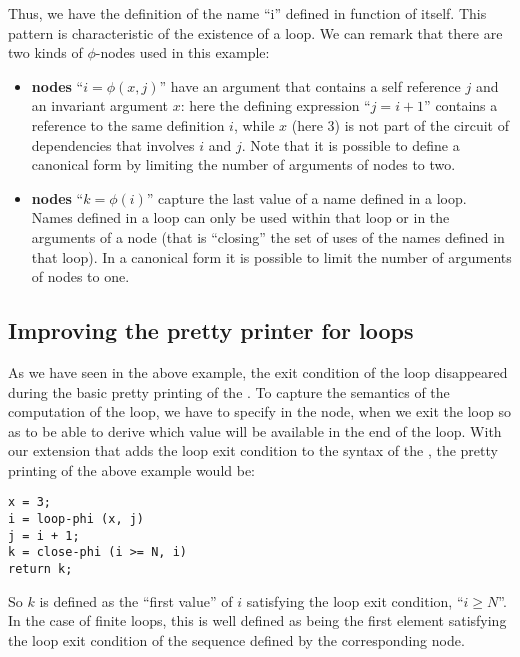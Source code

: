 {\noindent
Thus, we have the definition of the \SSA{} name ``i'' defined in
function of itself.  This pattern is characteristic of the existence
of a loop.  We can remark that there are two kinds of $\phi$-nodes used in this example:
\begin{itemize}
\item {\bf \loopphi{} nodes}  ``$i = \phi (x, j)$'' have an argument that contains a self reference $j$ and an invariant argument
  $x$: here the defining expression ``$j = i + 1$'' contains a reference to
  the same \loopphi{} definition $i$, while $x$ (here $3$) is not part of the circuit of dependencies that involves $i$ and $j$. Note that it is possible to define a
  canonical \SSA{} form by limiting the number of arguments of
  \loopphi{} nodes to two.
\item {\bf \closephi{} nodes} ``$k = \phi (i)$''  capture the last value of a name defined
  in a loop.  Names defined in a loop can only be used within that
  loop or in the arguments of a \closephi{} node (that is ``closing''
  the set of uses of the names defined in that loop).  In a canonical
  \SSA{} form it is possible to limit the number of arguments of
  \closephi{} nodes to one.
\end{itemize}

\subsection{Improving the \SSA{} pretty printer for loops}

As we have seen in the above example, the exit condition of the loop
disappeared during the basic pretty printing of the \SSA{}.  To capture
the semantics of the computation of the loop, we have to specify in
the \closephi{} node, when we exit the loop so as to be able to derive which value will be available in the end of the
loop. With our
extension that adds the loop exit condition to the syntax of the \closephi{}, the \SSA{} pretty printing of the above example would be:

\begin{center}
  \begin{minipage}{.8\linewidth}
\begin{verbatim}
x = 3;
i = loop-phi (x, j)
j = i + 1;
k = close-phi (i >= N, i)
return k;
\end{verbatim}
\end{minipage}
\end{center}
So $k$ is defined as the ``first value'' of $i$ satisfying the loop
exit condition, ``$i \geq N$''.  In the case of finite loops, this is well defined as being the first element satisfying the loop exit condition of the sequence defined by the corresponding \loopphi{} node.

}
